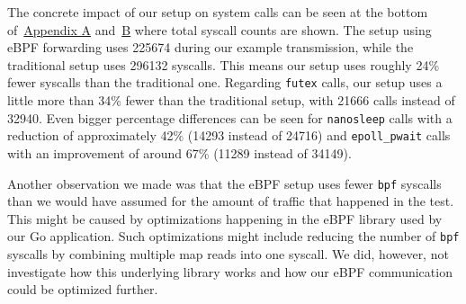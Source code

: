 The concrete impact of our setup on system calls can be seen at the bottom 
of~\hyperref[chap:appendix-fast-relay]{Appendix A} and~\hyperref[chap:appendix-plain-relay]{B} 
where total syscall counts are shown.
The setup using eBPF forwarding uses 225674 during our example transmission, while the traditional setup 
uses 296132 syscalls.
This means our setup uses roughly 24\% fewer syscalls than the traditional one.
Regarding \verb|futex| calls, our setup uses a little more than 34\% 
fewer than the traditional setup, with 21666 calls instead of 32940.
Even bigger percentage differences can be seen for \verb|nanosleep| calls with a reduction of 
approximately 42\% (14293 instead of 24716) and \verb|epoll_pwait| calls with 
an improvement of around 67\% (11289 instead of 34149).

Another observation we made was that the eBPF setup uses fewer \verb|bpf| syscalls than we would have assumed for 
the amount of traffic that happened in the test.
This might be caused by optimizations happening in the eBPF library used by our Go application.
Such optimizations might include reducing the number of \verb|bpf| syscalls 
by combining multiple map reads into one syscall.
We did, however, not investigate how this underlying library works and how our 
eBPF communication could be optimized further.